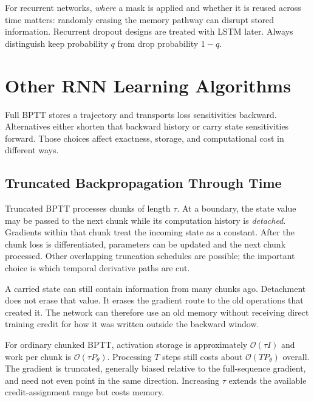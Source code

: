 \documentclass[11pt, oneside]{book}
\newcommand{\bigO}[1]{\mathcal{O}\!\left(#1\right)}
\let\originalsection\section
\renewcommand{\section}{\Needspace{7\baselineskip}\originalsection}
\let\originalsubsection\subsection
\renewcommand{\subsection}{\Needspace{6\baselineskip}\originalsubsection}
\begin{document}
For recurrent networks, \emph{where} a mask is applied and whether it is reused across time matters: randomly erasing the memory pathway can disrupt stored information. Recurrent dropout designs are treated with LSTM later. Always distinguish keep probability $q$ from drop probability $1-q$.

\section{Other RNN Learning Algorithms}\label{sec:source-2-4}
Full BPTT stores a trajectory and transports loss sensitivities backward. Alternatives either shorten that backward history or carry state sensitivities forward. Those choices affect exactness, storage, and computational cost in different ways.

\subsection{Truncated Backpropagation Through Time}\label{sec:source-2-4-1}
Truncated BPTT processes chunks of length $\tau$. At a boundary, the state value may be passed to the next chunk while its computation history is \emph{detached}. Gradients within that chunk treat the incoming state as a constant. After the chunk loss is differentiated, parameters can be updated and the next chunk processed. Other overlapping truncation schedules are possible; the important choice is which temporal derivative paths are cut.

\begin{intbox}[title={Remembering is different from assigning credit}]
A carried state can still contain information from many chunks ago. Detachment does not erase that value. It erases the gradient route to the old operations that created it. The network can therefore use an old memory without receiving direct training credit for how it was written outside the backward window.
\end{intbox}

For ordinary chunked BPTT, activation storage is approximately $\bigO{\tau I}$ and work per chunk is $\bigO{\tau P_\theta}$. Processing $T$ steps still costs about $\bigO{TP_\theta}$ overall. The gradient is truncated, generally biased relative to the full-sequence gradient, and need not even point in the same direction. Increasing $\tau$ extends the available credit-assignment range but costs memory.
\end{document}
